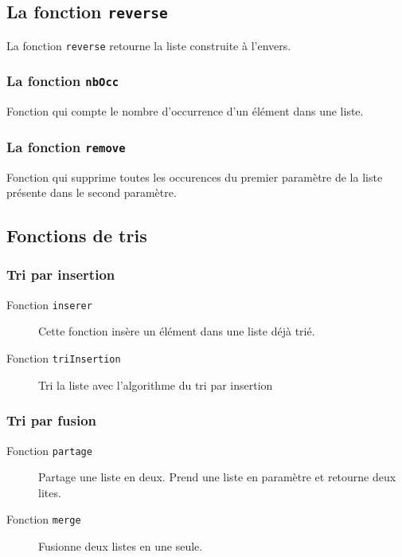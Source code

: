\subsection{La fonction \texttt{reverse}}
La fonction \texttt{reverse} retourne la liste construite à l'envers.


\subsubsection{La fonction \texttt{nbOcc}}
Fonction qui compte le nombre d'occurrence d'un élément dans une liste.

\subsubsection{La fonction \texttt{remove}}
Fonction qui supprime toutes les occurences du premier paramètre de la liste présente dans le second paramètre.


\subsection{Fonctions de tris}
\subsubsection{Tri par insertion}
\begin{description}
	\item[Fonction \texttt{inserer}] Cette fonction insère un élément dans une liste déjà trié.\\

	\item[Fonction \texttt{triInsertion}] Tri la liste avec l'algorithme du tri par insertion\\
		
\end{description}

\subsubsection{Tri par fusion}
\begin{description}
	\item[Fonction \texttt{partage}]Partage une liste en deux. Prend une liste en paramètre et retourne deux lites.
	
	\item[Fonction \texttt{merge}] Fusionne deux listes en une seule.
	
\end{description}




